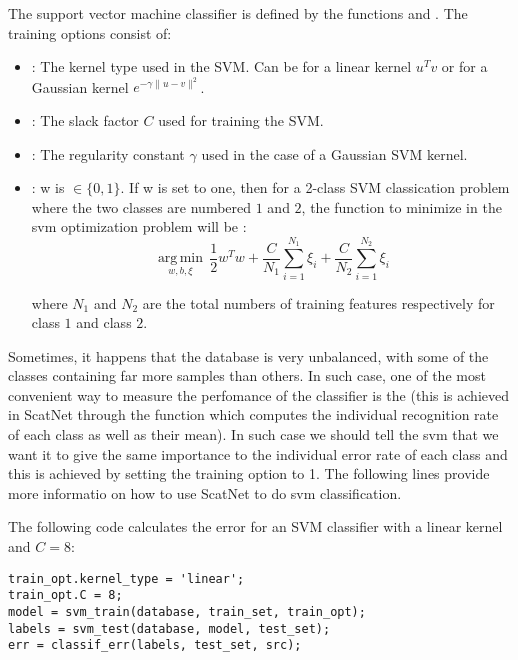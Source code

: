 \documentclass{article}
\begin{document}
The support vector machine classifier is defined by the functions  and . The training options consist of:
\begin{itemize}
	\item {}: The kernel type used in the SVM. Can be  for a linear kernel $u^Tv$ or  for a Gaussian kernel $e^{-\gamma\|u-v\|^2}$.
	\item {}: The slack factor $C$ used for training the SVM.
	\item {}: The regularity constant $\gamma$ used in the case of a Gaussian SVM kernel.
    \item {}: w is $\in \{0,1\}$. If w is set to one, then for a 2-class SVM classication problem where the two classes are numbered $1$ and $2$, the function to minimize in the svm optimization problem will be :
    \begin{equation*}
        \operatorname*{arg\,min}_{w,b,\xi} \, \frac{1}{2}w^{T}w + \frac{C}{N_1}\sum_{i=1}^{N_1}\xi_i +  \frac{C}{N_2}\sum_{i=1}^{N_2}\xi_i
    \end{equation*}
    
    where $N_1$ and $N_2$ are the total numbers of training features respectively for class $1$ and 
    class $2$.
  \end{itemize}  
    Sometimes, it happens that the database is very unbalanced, with some of the classes containing far more samples than others. In such case, one of the most convenient way to measure the perfomance of the classifier is the  (this is achieved in ScatNet through the function  which computes the individual recognition rate of each class as well as their mean).   
    In such case we should tell the svm that we want it to give the same importance to the individual error rate of each class and this is achieved by setting the training option  to 1.
    The following lines provide more informatio on how to use ScatNet to do svm classification.

The following code calculates the error for an SVM classifier with a linear kernel and $C = 8$:
\begin{lstlisting}
train_opt.kernel_type = 'linear';
train_opt.C = 8;
model = svm_train(database, train_set, train_opt);
labels = svm_test(database, model, test_set);
err = classif_err(labels, test_set, src);
\end{lstlisting}
\end{document}
